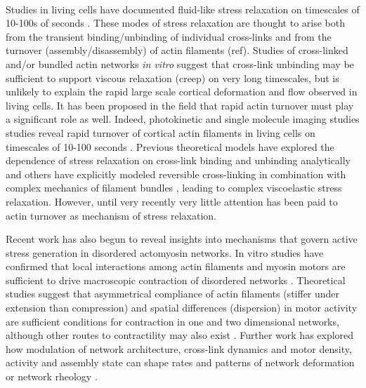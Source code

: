 \documentclass[10pt,letterpaper]{article}
\begin{document}
\paragraph{} Studies in living cells have documented fluid-like stress relaxation on timescales of 10-100s of seconds \cite{cellmech_flows,cellmech_flows2,cellmech_flows3,rheo_fluid,rheo_fluid2,cell_rheo_exp}.  These modes of stress relaxation are thought to arise both from the transient binding/unbinding of individual cross-links and from the turnover (assembly/disassembly) of actin filaments (ref).  Studies of cross-linked and/or bundled actin networks {\em in vitro} suggest that cross-link unbinding may be sufficient to support viscous relaxation (creep) on very long timescales\cite{rheo_crosslinksmatter,rheo_crosslinkslip1,rheo_crosslinkslip2,rheo_crosslinkslip3,rheo_nonaffine}, but is unlikely to explain the rapid large scale cortical deformation and flow observed in living cells.  It has been proposed in the field that rapid actin turnover must play a significant role as well. Indeed, photokinetic and single molecule imaging studies studies reveal rapid turnover of cortical actin filaments in living cells on timescales of 10-100 seconds \cite{Robin:2014aa}. Previous theoretical models have explored  the dependence of stress relaxation on cross-link binding and unbinding analytically \cite{theo_crosslinkslip1,theo_crosslinkslip2} and others have explicitly modeled reversible cross-linking in combination with complex mechanics of filament bundles \cite{model_taeyoon,rheo_crosslinkslip2,theo_crosslinkslip3}, leading to complex viscoelastic stress relaxation.  However, until very recently \cite{Mak:2016aa} very little attention has been paid to actin turnover as mechanism of stress relaxation. 

Recent work has also begun to reveal insights into mechanisms that govern active stress generation in disordered actomyosin networks. In vitro studies have confirmed that local interactions among actin filaments and myosin motors are sufficient to drive macroscopic contraction of disordered networks \cite{rheo_2D1}.  Theoretical studies suggest that asymmetrical compliance of actin filaments (stiffer under extension than compression) and spatial differences (dispersion) in motor activity are sufficient conditions for contraction in one \cite{1367-2630-14-3-033037} and two \cite{PhysRevX.4.041002} dimensional networks, although other routes to contractility may also exist \cite{PhysRevX.4.041002}.  Further work has explored how modulation of network architecture, cross-link dynamics and motor density, activity and assembly state can shape rates and patterns of network deformation \cite{10.1371/journal.pone.0039869,Alvarado:2013aa,C0SM00494D} or network rheology \cite{0295-5075-85-1-18007,rheo_active}.  
\end{document}
